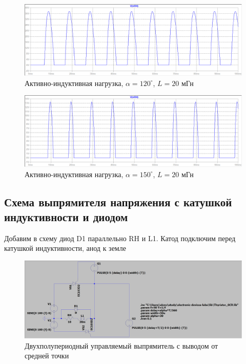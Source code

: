 \documentclass[a4paper, 12pt]{article}
\begin{document}
    \begin{figure}[H]
        \centering
        \includegraphics[scale=0.45]{a120_L20m.png}
        \captionsetup{skip=0pt}
        \caption{Активно-индуктивная нагрузка, $\alpha=120^{\circ}$, $L=20$ мГн}
        \label{fig:a120_L20m}
    \end{figure}
    \begin{figure}[H]
        \centering
        \includegraphics[scale=0.45]{a150_L20m.png}
        \captionsetup{skip=0pt}
        \caption{Активно-индуктивная нагрузка, $\alpha=150^{\circ}$, $L=20$ мГн}
        \label{fig:a150_L20m}
    \end{figure}
    \vfill


    \subsection{Схема выпрямителя напряжения с катушкой индуктивности и диодом}
    Добавим в схему диод D1 параллельно RH и L1. Катод подключим перед катушкой индуктивности,
    анод к земле
    \begin{figure}[H]
        \centering
        \includegraphics[scale=0.22]{scheme3.png}
        \captionsetup{skip=0pt}
        \caption{Двухполупериодный управляемый выпрямитель с выводом от средней точки}
        \label{fig:scheme3}
    \end{figure}
\end{document}
